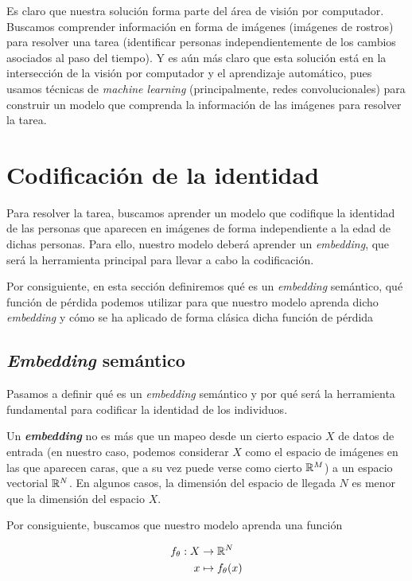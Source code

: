 Es claro que nuestra solución forma parte del área de visión por computador. Buscamos comprender información en forma de imágenes (imágenes de rostros) para resolver una tarea (identificar personas independientemente de los cambios asociados al paso del tiempo). Y es aún más claro que esta solución está en la intersección de la visión por computador y el aprendizaje automático, pues usamos técnicas de \textit{machine learning} (principalmente, redes convolucionales) para construir un modelo que comprenda la información de las imágenes para resolver la tarea.

\section{Codificación de la identidad}

Para resolver la tarea, buscamos aprender un modelo que codifique la identidad de las personas que aparecen en imágenes de forma independiente a la edad de dichas personas. Para ello, nuestro modelo deberá aprender un \textit{embedding}, que será la herramienta principal para llevar a cabo la codificación.

Por consiguiente, en esta sección definiremos qué es un \textit{embedding} semántico, qué función de pérdida podemos utilizar para que nuestro modelo aprenda dicho \textit{embedding} y cómo se ha aplicado de forma clásica dicha función de pérdida

\subsection{\textit{Embedding} semántico} \label{isec:embeddings}

Pasamos a definir qué es un \textit{embedding} semántico y por qué será la herramienta fundamental para codificar la identidad de los individuos.

Un \textbf{\textit{embedding}} no es más que un mapeo desde un cierto espacio $X$ de datos de entrada (en nuestro caso, podemos considerar $X$ como el espacio de imágenes en las que aparecen caras, que a su vez puede verse como cierto $\mathbb{R}^M$) a un espacio vectorial $\mathbb{R}^N$. En algunos casos, la dimensión del espacio de llegada $N$ es menor que la dimensión del espacio $X$.

Por consiguiente, buscamos que nuestro modelo aprenda una función

\begin{equation}
\begin{split}
    f_{\theta}: X & \to \mathbb{R}^N \\
    x & \mapsto f_{\theta}(x)
\end{split}
\end{equation}

